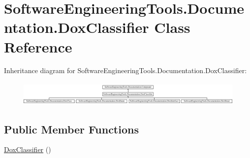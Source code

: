 \hypertarget{class_software_engineering_tools_1_1_documentation_1_1_dox_classifier}{\section{Software\+Engineering\+Tools.\+Documentation.\+Dox\+Classifier Class Reference}
\label{class_software_engineering_tools_1_1_documentation_1_1_dox_classifier}
}
Inheritance diagram for Software\+Engineering\+Tools.\+Documentation.\+Dox\+Classifier\+:\begin{figure}[H]
\begin{center}
\leavevmode
\includegraphics[height=1.257485cm]{class_software_engineering_tools_1_1_documentation_1_1_dox_classifier}
\end{center}
\end{figure}
\subsection*{Public Member Functions}
\begin{DoxyCompactItemize}
\item 
\hyperlink{class_software_engineering_tools_1_1_documentation_1_1_dox_classifier_a6d60e2cd975944379eadd31b2dd44570}{Dox\+Classifier} ()
\end{DoxyCompactItemize}
